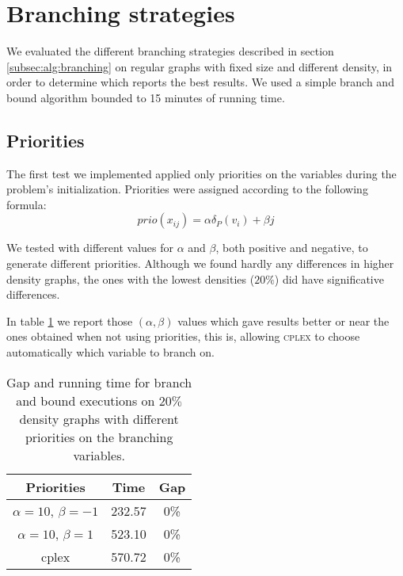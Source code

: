 
\section{Branching strategies}
\label{subsec:resultsbranching}

We evaluated the different branching strategies described in section \ref{subsec:alg:branching} on regular graphs with fixed size and different density, in order to determine which reports the best results. We used a simple branch and bound algorithm bounded to 15 minutes of running time.

\subsection{Priorities}

The first test we implemented applied only priorities on the variables during the problem's initialization. Priorities were assigned according to the following formula:
\begin{equation*}
	prio(x_{ij}) = \alpha \delta_P(v_i) + \beta j
\end{equation*}

We tested with different values for $\alpha$ and $\beta$, both positive and negative, to generate different priorities. Although we found hardly any differences in higher density graphs, the ones with the lowest densities ($20\%$) did have significative differences.

In table \ref{table:branch:static} we report those $(\alpha,\beta)$ values which gave results better or near the ones obtained when not using priorities, this is, allowing \textsc{cplex} to choose automatically which variable to branch on.

\begin{table}[h]
\centering

\begin{tabular}{|c|c|c|}
\hline
\textbf{Priorities} & \textbf{Time} & \textbf{Gap} \\
\hline
$\alpha = 10$, $\beta = -1$ &  232.57 & 0\% \\
$\alpha = 10$, $\beta = 1$ & 523.10 & 0\% \\
cplex & 570.72 & 0\% \\
\hline
 \end{tabular}

\caption{Gap and running time for branch and bound executions on $20\%$ density graphs with different priorities on the branching variables.}
\label{table:branch:static}

\end{table}	

